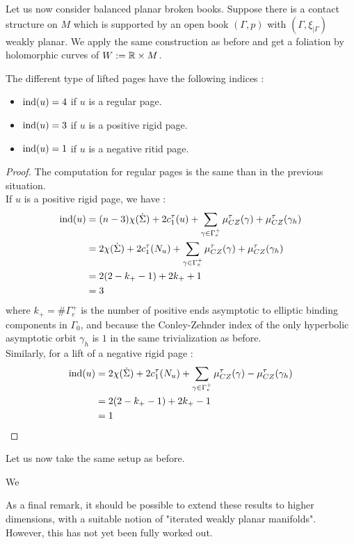 \documentclass[../main.tex]{subfiles}
\begin{document}
Let us now consider balanced planar broken books. Suppose there is a contact structure on $M$ which is supported by an open book $(\Gamma,p)$ with $(\Gamma,\xi_{|\Gamma})$ weakly planar. We apply the same construction as before and get a foliation by holomorphic curves of $W := \mathbb{R}\times M$.

\begin{lemma}
The different type of lifted pages have the following indices :
\begin{itemize}
    \item $\text{ind}(u) = 4$ if $u$ is a regular page.
    \item $\text{ind}(u) = 3$ if $u$ is a positive rigid page.
    \item $\text{ind}(u) = 1$ if $u$ is a negative ritid page.
\end{itemize}
\end{lemma}

\begin{proof}
The computation for regular pages is the same than in the previous situation. \\
If $u$ is a positive rigid page, we have :
\begin{align*}
    \text{ind}(u) &= (n-3)\chi(\dot\Sigma) + 2c_1^\tau(u) + \displaystyle\sum_{\gamma\in \Gamma_e^+}\mu_{CZ}^\tau(\gamma) + \mu^\tau_{CZ}(\gamma_h)\\
        & = 2\chi(\dot\Sigma) + 2c_1^\tau(N_u) +  \displaystyle\sum_{\gamma\in \Gamma_e^+}\mu_{CZ}^\tau(\gamma)+ \mu^\tau_{CZ}(\gamma_h)\\
        &= 2(2 - k_+ - 1 ) + 2k_+ + 1\\
        &= 3
\end{align*}
where $k_+ = \#\Gamma_e^+$ is the number of positive ends asymptotic to elliptic binding components in $\Gamma_0$, and because the Conley-Zehnder index of the only hyperbolic asymptotic orbit $\gamma_h$ is $1$ in the same trivialization as before. \\
Similarly, for a lift of a negative rigid page : 
\begin{align*}
    \text{ind}(u)  & = 2\chi(\dot\Sigma) + 2c_1^\tau(N_u) +  \displaystyle\sum_{\gamma\in \Gamma_e^+}\mu_{CZ}^\tau(\gamma) - \mu_{CZ}^\tau(\gamma_h)\\
        &= 2(2 - k_+ - 1 ) + 2k_+ - 1\\
        &= 1
\end{align*}
\end{proof}

Let us now take the same setup as before. 

\begin{proposition}

\end{proposition}

We 


\begin{remark}
As a final remark, it should be possible to extend these results to higher dimensions, with a suitable notion of "iterated weakly planar manifolds". However, this has not yet been fully worked out.
\end{remark}
\end{document}
